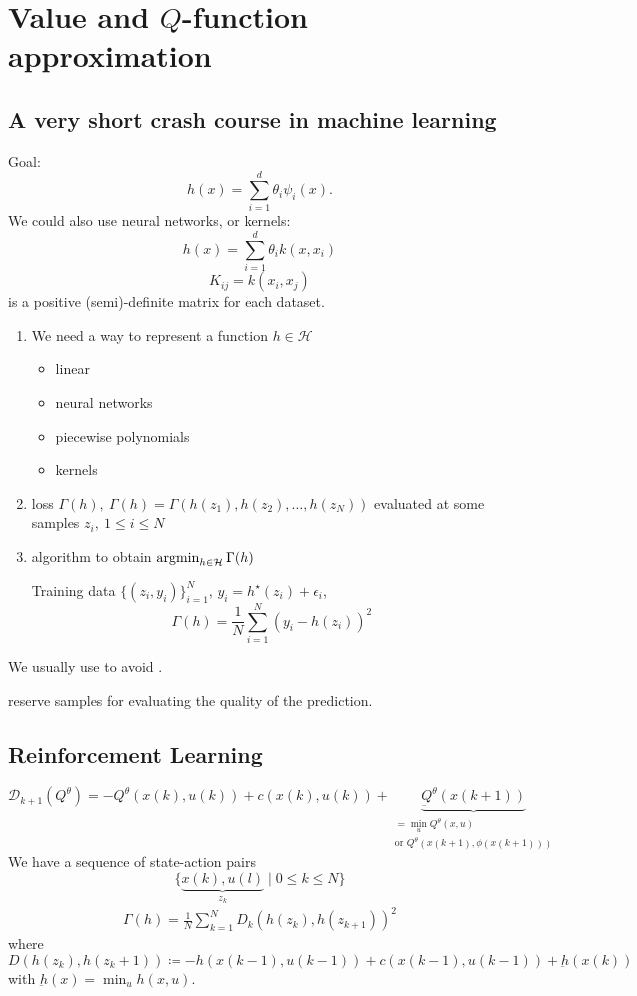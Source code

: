 \chapter{Value and \(Q\)-function approximation}

\section{A very short crash course in machine learning}


Goal: \[h(x)=\sum_{i=1}^d \theta_i \psi_i(x).\]
We could also use neural networks, or kernels: 
\[h(x)=\sum_{i=1}^d\theta_ik(x,x_i)\]
\[K_{ij}=k(x_i,x_j)\]
is a positive (semi)-definite matrix for each dataset.

\begin{enumerate}
    \item We need a way to represent a function \(h\in \mathcal{H}\)\begin{itemize}
        \item linear
        \item neural networks 
        \item piecewise polynomials 
        \item kernels
    \end{itemize}
    \item loss \(\Gamma(h),\ \Gamma(h)=\Gamma(h(z_1),h(z_2),\dots,h(z_N))\) evaluated at some samples \(z_i,\ 1\leq i\leq N\)
    \item algorithm to obtain \(\operatorname*{\text{argmin}}_{h\in \mathcal{H}}\Gamma(h)\)

        Training data \(\{(z_i,y_i)\}_{i=1}^N\), \(y_i=h^\star(z_i)+\epsilon_i\),
        \[\Gamma(h)=\frac{1}{N}\sum_{i=1}^N \left(y_i-h(z_i)\right)^2\]
\end{enumerate}
We usually use  to avoid .

 reserve samples for evaluating the quality of the prediction. 

\section{Reinforcement Learning}
\[\mathcal{D}_{k+1}(Q^\theta)=-Q^\theta(x(k),u(k))+c(x(k),u(k))+\underbrace{\underbar{Q}^\theta(x(k+1))}_{\substack{=\min_u Q^\theta(x,u)\\ \text{or }Q^\theta(x(k+1),\phi(x(k+1)))}}\]
We have a sequence of state-action pairs 
\[\{\underbrace{x(k),u(l)}_{z_k}\mid 0\leq k\leq N\}\]
\begin{align*}
    \Gamma(h)=\frac{1}{N}\sum_{k=1}^{N}D_k(h(z_k),h(z_{k+1}))^2
\end{align*}
where \[D(h(z_k),h(z_k+1))\coloneqq -h(x(k-1),u(k-1))+c(x(k-1),u(k-1))+\underbar{h}(x(k))\]
with \(\underbar{h}(x)=\min_{u}h(x,u)\).

